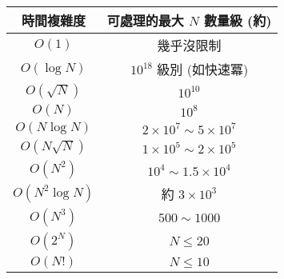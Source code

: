 \begin{center}
\begin{tabular}{|c|c|}
\hline
\textbf{時間複雜度} & \textbf{可處理的最大 $N$ 數量級 (約)} \\
\hline
$O(1)$ & 幾乎沒限制 \\
$O(\log N)$ & $10^{18}$ 級別 (如快速冪) \\
$O(\sqrt{N})$ & $10^{10}$ \\
$O(N)$ & $10^{8}$ \\
$O(N \log N)$ & $2 \times 10^{7} \sim 5 \times 10^{7}$ \\
$O(N \sqrt{N})$ & $1 \times 10^{5} \sim 2 \times 10^{5}$ \\
$O(N^2)$ & $10^{4} \sim 1.5 \times 10^{4}$ \\
$O(N^2 \log N)$ & 約 $3 \times 10^{3}$ \\
$O(N^3)$ & $500 \sim 1000$ \\
$O(2^N)$ & $N \leq 20$ \\
$O(N!)$ & $N \leq 10$ \\
\hline
\end{tabular}
\end{center}